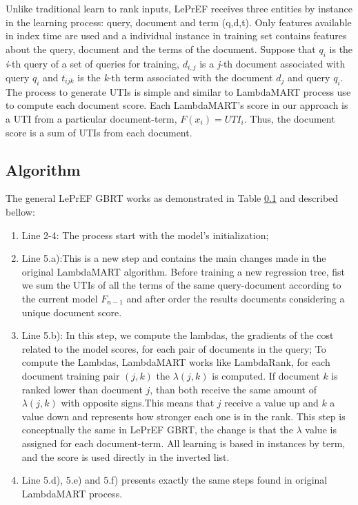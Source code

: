 \documentclass[preprint,12pt,3p]{elsarticle}
\begin{document}
Unlike traditional learn to rank inputs, LePrEF receives three entities by instance in the learning process: query, document and term (q,d,t). Only features available in index time are used and a individual instance in training set contains features about the query, document and the terms of the document. Suppose that $q_i$ is the \textit{i}-th query of a set of queries for training, $d_{i,j}$ is a \textit{j}-th document associated with query $q_i$ and $t_{ijk}$ is the \textit{k}-th term associated with the document $d_j$ and query $q_i$. The process to generate UTIs is simple and similar to LambdaMART process use to compute each document score. Each LambdaMART's score in our approach is a UTI from a particular document-term, $F(x_i) = UTI_i$. Thus, the document score is a sum of UTIs from each document. 

\subsection{Algorithm}
\label{sec:algorithm} 

 The general LePrEF GBRT works as demonstrated in Table \ref{sec:algorithm} and described bellow:
 
 \begin{enumerate}
 \item{Line 2-4: The process start with the model's initialization;} 
 \item{Line 5.a):This is a new step and contains the main changes made in the original LambdaMART algorithm. Before training a new regression tree, fist we sum the UTIs of all the terms of the same query-document according to the current model $F_{n-1}$ and after order the results documents considering a unique document score.} 
 \item{Line 5.b): In this step, we compute the lambdas, the gradients of the cost related to the model scores, for each pair of documents in the query; To compute the Lambdas, LambdaMART works like LambdaRank, for each document training pair $(j,k)$ the $\lambda(j,k)$ is computed. If document $k$ is ranked lower than document $j$, than both receive the same amount of $\lambda(j,k)$ with opposite signs.This means that $j$ receive a value up and $k$ a value down and represents how stronger each one is in the rank. This step is conceptually the same in LePrEF GBRT, the change is that the $\lambda$ value is assigned for each document-term. All learning is based in instances by term, and the score is used directly in the inverted list.}
 \item{Line 5.d), 5.e) and 5.f) presents exactly the same steps found in original LambdaMART process.}
\end{enumerate}
\end{document}
